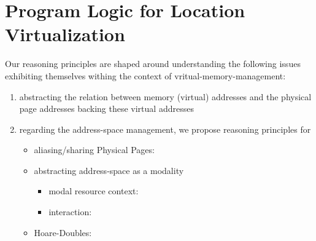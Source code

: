 \section{Program Logic for Location Virtualization}
\label{sec:logic}
Our reasoning principles are shaped around understanding the following issues exhibiting themselves withing the context of vritual-memory-management:
\begin{enumerate}
\item abstracting the relation between memory (virtual) addresses and the physical page addresses backing these virtual addresses
\item regarding the address-space management, we propose reasoning principles for
  \begin{itemize}
  \item aliasing/sharing Physical Pages:
  \item abstracting address-space as a modality
    \begin{itemize}
    \item modal resource context:
    \item interaction:
    \end{itemize}
    \item Hoare-Doubles: 
  \end{itemize}
\end{enumerate}
